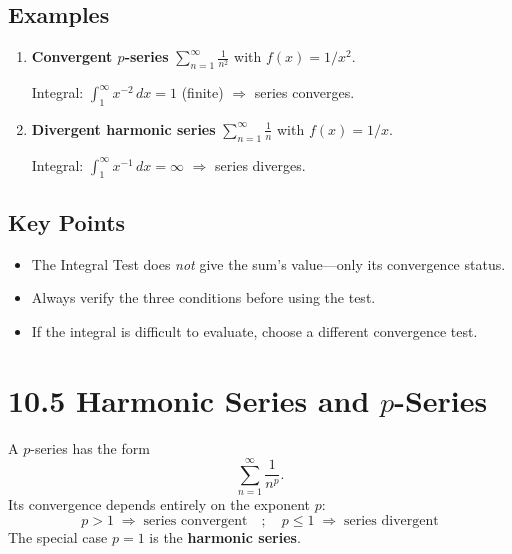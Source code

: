 \documentclass{article}
\begin{document}
\subsection*{Examples}

\begin{enumerate}[label=\textbf{\arabic*.},itemsep=10pt]

  \item \textbf{Convergent \(p\)-series}
        \(\displaystyle\sum_{n=1}^{\infty}\frac{1}{n^{2}}\)
        with \(f(x)=1/x^{2}\).

        Integral: \(\displaystyle\int_{1}^{\infty} x^{-2}\,dx = 1\) (finite)
        \(\Rightarrow\) series converges.

  \item \textbf{Divergent harmonic series}
        \(\displaystyle\sum_{n=1}^{\infty}\frac{1}{n}\)
        with \(f(x)=1/x\).

        Integral: \(\displaystyle\int_{1}^{\infty} x^{-1}\,dx = \infty\)
        \(\Rightarrow\) series diverges.

\end{enumerate}

\subsection*{Key Points}
\begin{itemize}[itemsep=4pt]
  \item The Integral Test does \emph{not} give the sum’s value—only its convergence status.
  \item Always verify the three conditions before using the test.
  \item If the integral is difficult to evaluate, choose a different convergence test.
\end{itemize}

\newpage
\section{10.5 Harmonic Series and \(p\)-Series}

\begin{tcolorbox}[colback=gray!8,colframe=black,title=Big-Idea]
A \(p\)-series has the form
\[
\sum_{n=1}^{\infty} \frac{1}{n^{p}}.
\]
Its convergence depends entirely on the exponent \(p\):
\[
\boxed{\;p>1 \;\Rightarrow\; \text{series convergent}\quad;\quad
       p\le 1 \;\Rightarrow\; \text{series divergent}\;}
\]
The special case \(p=1\) is the \textbf{harmonic series}.
\end{tcolorbox}
\end{document}
